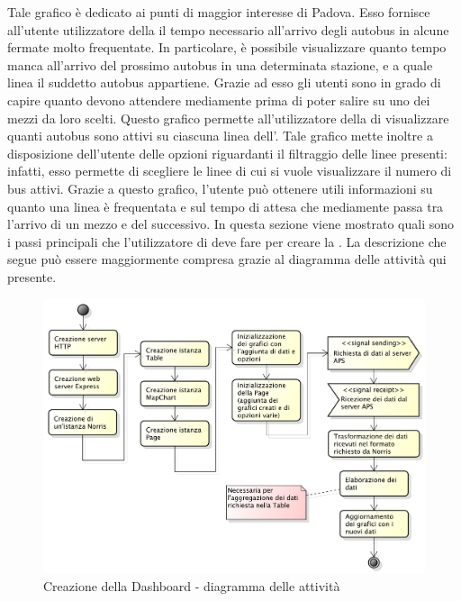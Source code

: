     		Tale grafico è dedicato ai punti di maggior interesse di Padova. Esso fornisce all'utente utilizzatore della  il tempo necessario all'arrivo degli autobus in alcune fermate  molto frequentate. In particolare, è possibile visualizzare quanto tempo manca all'arrivo del prossimo autobus in una determinata stazione, e a quale linea il suddetto autobus appartiene. Grazie ad esso gli utenti sono in grado di capire quanto devono attendere mediamente prima di poter salire su uno dei mezzi da loro scelti.
    		Questo grafico permette all'utilizzatore della  di visualizzare quanti autobus sono attivi su ciascuna linea dell'. Tale grafico mette inoltre a disposizione dell'utente delle opzioni riguardanti il filtraggio delle linee presenti: infatti, esso permette di scegliere le linee di cui si vuole visualizzare il numero di bus attivi. Grazie a questo grafico, l'utente può ottenere utili informazioni su quanto una linea è frequentata e sul tempo di attesa che mediamente passa tra l'arrivo di un mezzo e del successivo.
        In questa sezione viene mostrato quali sono i passi principali che l'utilizzatore di  deve fare per creare la  . La descrizione che segue può essere maggiormente compresa grazie al diagramma delle attività qui presente.
        \begin{figure}[H]\centering
            \includegraphics[width=\textwidth]{SpecificaTecnica/Pics/CreateDashboard}
            \caption{Creazione della Dashboard - diagramma delle attività}
        \end{figure}
